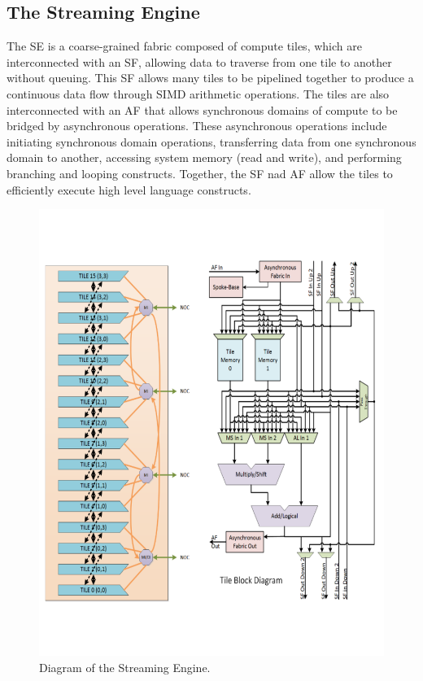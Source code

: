 \subsection{The Streaming Engine}

The SE is a coarse-grained fabric composed of compute tiles, which are interconnected with an SF, allowing data to traverse from one tile to another without queuing.
This SF allows many tiles to be pipelined together to produce a continuous data flow through SIMD arithmetic operations.
The tiles are also interconnected with an AF that allows synchronous domains of compute to be bridged by asynchronous operations.
These asynchronous operations include initiating synchronous domain operations, transferring data from one synchronous domain to another, accessing system memory (read and write), and performing branching and looping constructs.
Together, the SF nad AF allow the tiles to efficiently execute high level language constructs.

\begin{figure}
  \centering
  \includegraphics[trim=10 100 10 50, clip, width=\linewidth]{fig/se_device_tile.pdf}
  \caption{
    Diagram of the Streaming Engine.
  }
  \label{fig:se_diagram}
\end{figure}

